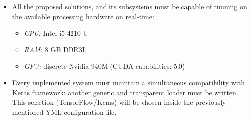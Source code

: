 \begin{itemize}
	\item All the proposed solutions, and its subsystems must be capable of running on the available processing hardware on real-time:
	\begin{itemize}
		\item \emph{CPU:} Intel i5 4210-U
		\item \emph{RAM:} 8 GB DDR3L
		\item \emph{GPU:} discrete Nvidia 940M (CUDA capabilities: 5.0)
	\end{itemize}
	
	\label{sec:2_available_hw}
	\item Every implemented system must maintain a simultaneous compatibility with Keras framework: another generic and transparent loader must be written. This selection (TensorFlow/Keras) will be chosen inside the previously mentioned YML configuration file.
\end{itemize}
